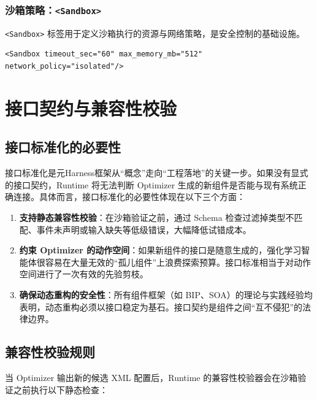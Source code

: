 \subsubsection{沙箱策略：\texttt{<Sandbox>}}

\texttt{<Sandbox>} 标签用于定义沙箱执行的资源与网络策略，是安全控制的基础设施。

\begin{lstlisting}[caption={沙箱策略定义示例}, label={lst:sandbox}]
<Sandbox timeout_sec="60" max_memory_mb="512" network_policy="isolated"/>
\end{lstlisting}

\section{接口契约与兼容性校验}

\subsection{接口标准化的必要性}

接口标准化是元Harness框架从“概念”走向“工程落地”的关键一步。如果没有显式的接口契约，Runtime 将无法判断 Optimizer 生成的新组件是否能与现有系统正确连接。具体而言，接口标准化的必要性体现在以下三个方面：

\begin{enumerate}
    \item \textbf{支持静态兼容性校验}：在沙箱验证之前，通过 Schema 检查过滤掉类型不匹配、事件未声明或输入缺失等低级错误，大幅降低试错成本。
    \item \textbf{约束 Optimizer 的动作空间}：如果新组件的接口是随意生成的，强化学习智能体很容易在大量无效的“孤儿组件”上浪费探索预算。接口标准相当于对动作空间进行了一次有效的先验剪枝。
    \item \textbf{确保动态重构的安全性}：所有组件框架（如 BIP、SOA）的理论与实践经验均表明，动态重构必须以接口稳定为基石。接口契约是组件之间“互不侵犯”的法律边界。
\end{enumerate}

\subsection{兼容性校验规则}

当 Optimizer 输出新的候选 XML 配置后，Runtime 的兼容性校验器会在沙箱验证之前执行以下静态检查：

